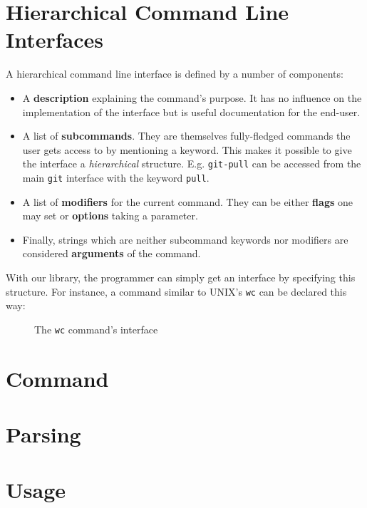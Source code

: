 \documentclass[preprint,9pt]{sigplanconf}
\begin{document}
\section{Hierarchical Command Line Interfaces}

A hierarchical command line interface is defined by a number
of components:

\begin{itemize}
\item A \textbf{description} explaining the command's purpose. It has no
influence on the implementation of the interface but is useful
documentation for the end-user.

\item A list of \textbf{subcommands}. They are themselves fully-fledged
commands the user gets access to by mentioning a keyword. This
makes it possible to give the interface a \emph{hierarchical}
structure. E.g. \texttt{git-pull} can be accessed from the main
\texttt{git} interface with the keyword \texttt{pull}.

\item A list of \textbf{modifiers} for the current command. They can
be either \textbf{flags} one may set or \textbf{options} taking
a parameter.

\item Finally, strings which are neither subcommand keywords nor
modifiers are considered \textbf{arguments} of the command.
\end{itemize}

With our library, the programmer can simply get an interface by
specifying this structure. For instance, a command similar to
UNIX's \texttt{wc} can be declared this way:

\begin{figure}[ht]
\caption{The \texttt{wc} command's interface}
\end{figure}

\begin{figure}[ht]
\end{figure}

\section{Command}

\cite{mcbride2014keep}

\section{Parsing}
\section{Usage}



\end{document}
